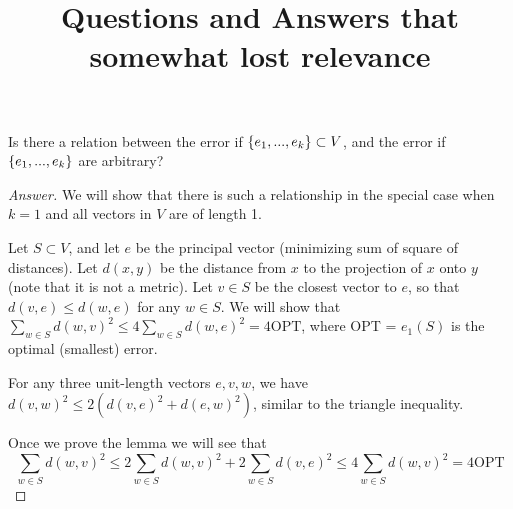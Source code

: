 \documentclass{article}
\title{Questions and Answers that somewhat lost relevance}
\begin{document}
\maketitle

\begin{question}
    Is there a relation between the error if $\left\{e_1,...,e_k\right\}\subset V$, and the error if $\left\{e_1,...,e_k\right\}$ are arbitrary?
\end{question}

\begin{proof}[Answer]\label{A: relationsip between OPT and sample representative error}
We will show that there is such a relationship in the special case when $k=1$ and all vectors in $V$ are of length 1.

Let $S\subset V$, and let $e$ be the principal vector (minimizing sum of square of distances). Let $d(x,y)$ be the distance from $x$ to the projection of $x$ onto $y$ (note that it is not a metric). Let $v\in S$ be the closest vector to $e$, so that $d(v,e)\leq d(w,e)$ for any $w\in S$. We will show that $\sum_{w\in S}d(w,v)^2\leq 4\sum_{w\in S}d(w,e)^2 = 4\text{OPT}$, where OPT = $e_1(S)$ is the optimal (smallest) error.

\begin{lemma}\label{lemma: triangle inequality for projection distance}
For any three unit-length vectors $e,v,w$, we have $d(v,w)^2\leq 2(d(v,e)^2+d(e,w)^2)$, similar to the triangle inequality.
\end{lemma}
Once we prove the lemma we will see that 
\begin{equation}\label{eqn: main equation for proof in case k = 1}
    \sum_{w\in S}d(w,v)^2\leq 2\sum_{w\in S}d(w,v)^2+2\sum_{w\in S}d(v,e)^2\leq 4\sum_{w\in S}d(w,v)^2 = 4\text{OPT}
\end{equation}


\end{proof}
\end{document}
